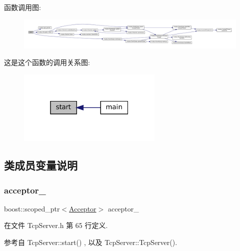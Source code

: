 函数调用图\+:
\nopagebreak
\begin{figure}[H]
\begin{center}
\leavevmode
\includegraphics[width=350pt]{classmuduo_1_1TcpServer_a60de64d75454385b23995437f1d72669_cgraph}
\end{center}
\end{figure}
这是这个函数的调用关系图\+:
\nopagebreak
\begin{figure}[H]
\begin{center}
\leavevmode
\includegraphics[width=196pt]{classmuduo_1_1TcpServer_a60de64d75454385b23995437f1d72669_icgraph}
\end{center}
\end{figure}


\subsection{类成员变量说明}
\mbox{\label{classmuduo_1_1TcpServer_ae5dd43c1da06f8fcb95db8add7e93e49}} 
\subsubsection{\texorpdfstring{acceptor\+\_\+}{acceptor\_}}
{\footnotesize\ttfamily boost\+::scoped\+\_\+ptr$<$\hyperlink{classmuduo_1_1Acceptor}{Acceptor}$>$ acceptor\+\_\+\hspace{0.3cm}{\ttfamily [private]}}



在文件 Tcp\+Server.\+h 第 65 行定义.



参考自 Tcp\+Server\+::start() , 以及 Tcp\+Server\+::\+Tcp\+Server().

